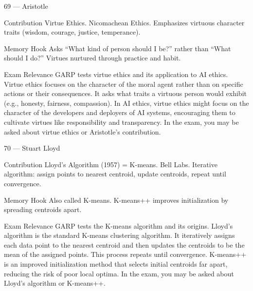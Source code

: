 \documentclass[aspectratio=169,8pt]{beamer}
\begin{document}
	\begin{frame}{69 --- Aristotle}
		\begin{block}{Contribution}
			Virtue Ethics. Nicomachean Ethics. Emphasizes virtuous character traits (wisdom, courage, justice, temperance).
		\end{block}
		\begin{block}{Memory Hook}
			Asks ``What kind of person should I be?'' rather than ``What should I do?'' Virtues nurtured through practice and habit.
		\end{block}
		\begin{block}{Exam Relevance}
			GARP tests virtue ethics and its application to AI ethics. Virtue ethics focuses on the character of the moral agent rather than on specific actions or their consequences. It asks what traits a virtuous person would exhibit (e.g., honesty, fairness, compassion). In AI ethics, virtue ethics might focus on the character of the developers and deployers of AI systems, encouraging them to cultivate virtues like responsibility and transparency. In the exam, you may be asked about virtue ethics or Aristotle's contribution.
		\end{block}
	\end{frame}
	
	\begin{frame}{70 --- Stuart Lloyd}
		\begin{block}{Contribution}
			Lloyd's Algorithm (1957) = K-means. Bell Labs. Iterative algorithm: assign points to nearest centroid, update centroids, repeat until convergence.
		\end{block}
		\begin{block}{Memory Hook}
			Also called K-means. K-means++ improves initialization by spreading centroids apart.
		\end{block}
		\begin{block}{Exam Relevance}
			GARP tests the K-means algorithm and its origins. Lloyd's algorithm is the standard K-means clustering algorithm. It iteratively assigns each data point to the nearest centroid and then updates the centroids to be the mean of the assigned points. This process repeats until convergence. K-means++ is an improved initialization method that selects initial centroids far apart, reducing the risk of poor local optima. In the exam, you may be asked about Lloyd's algorithm or K-means++.
		\end{block}
	\end{frame}
	
\end{document}

